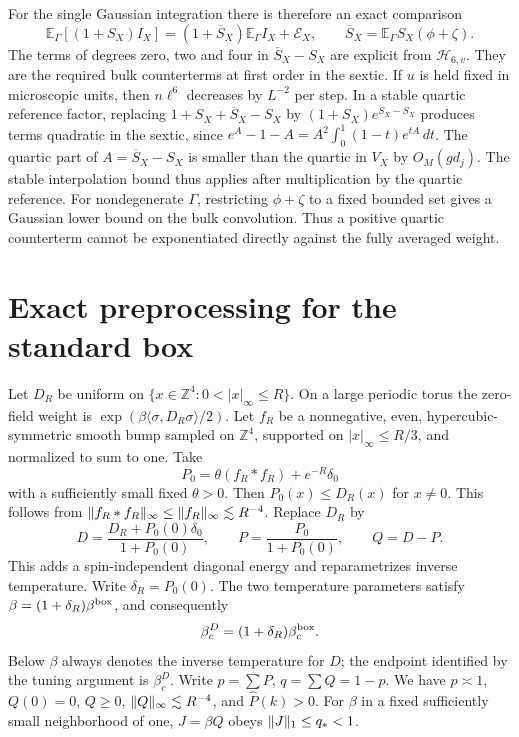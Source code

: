 \documentclass[11pt]{article}
\newcommand{\E}{\mathbb E}
\newcommand{\Z}{\mathbb Z}
\DeclarePairedDelimiter{\norm}{\lVert}{\rVert}
\begin{document}
For the single Gaussian integration there is therefore an exact comparison
\begin{equation}\label{eq:comparison}
 \E_\Gamma[(1+S_X)I_X]=(1+\overline S_X)\E_\Gamma I_X+\mathcal E_X,
 \qquad \overline S_X=\E_\Gamma S_X(\phi+\zeta).
\end{equation}
The terms of degrees zero, two and four in \(\overline S_X-S_X\) are explicit from \(\mathcal H_{6,v}\). They are the required bulk counterterms at first order in the sextic. If \(u\) is held fixed in microscopic units, then \(n\ell^6\) decreases by \(L^{-2}\) per step. In a stable quartic reference factor, replacing \(1+S_X+\overline S_X-S_X\) by \((1+S_X)e^{\overline S_X-S_X}\) produces terms quadratic in the sextic, since \(e^A-1-A=A^2\int_0^1(1-t)e^{tA}\,dt\). The quartic part of \(A=\overline S_X-S_X\) is smaller than the quartic in \(V_X\) by \(O_M(gd_j)\). The stable interpolation bound thus applies after multiplication by the quartic reference. For nondegenerate \(\Gamma\), restricting \(\phi+\zeta\) to a fixed bounded set gives a Gaussian lower bound on the bulk convolution. Thus a positive quartic counterterm cannot be exponentiated directly against the fully averaged weight.

\section{Exact preprocessing for the standard box}

Let \(D_R\) be uniform on \(\{x\in\Z^4:0<|x|_\infty\le R\}\). On a large periodic torus the zero-field weight is \(\exp(\beta\langle\sigma,D_R\sigma\rangle/2)\). Let \(f_R\) be a nonnegative, even, hypercubic-symmetric smooth bump sampled on \(\Z^4\), supported on \(|x|_\infty\le R/3\), and normalized to sum to one. Take
\[
 P_0=\theta(f_R*f_R)+e^{-R}\delta_0
\]
with a sufficiently small fixed \(\theta>0\). Then \(P_0(x)\le D_R(x)\) for \(x\ne0\). This follows from \(\norm{f_R*f_R}_\infty\le\norm{f_R}_\infty\lesssim R^{-4}\). Replace \(D_R\) by
\[
 D=\frac{D_R+P_0(0)\delta_0}{1+P_0(0)},\qquad
 P=\frac{P_0}{1+P_0(0)},\qquad Q=D-P .
\]
This adds a spin-independent diagonal energy and reparametrizes inverse temperature. Write \(\delta_R=P_0(0)\). The two temperature parameters satisfy
\(\beta=(1+\delta_R)\beta^{\rm box}\), and consequently
\[
 \beta_c^D=(1+\delta_R)\beta_c^{\rm box}.
\]
Below \(\beta\) always denotes the inverse temperature for \(D\);
the endpoint identified by the tuning argument is \(\beta_c^D\). Write \(p=\sum P\), \(q=\sum Q=1-p\). We have \(p\asymp1\), \(Q(0)=0\), \(Q\ge0\), \(\norm{Q}_\infty\lesssim R^{-4}\), and \(\widehat P(k)>0\). For \(\beta\) in a fixed sufficiently small neighborhood of one, \(J=\beta Q\) obeys \(\norm{J}_1\le q_*<1\).
\end{document}
